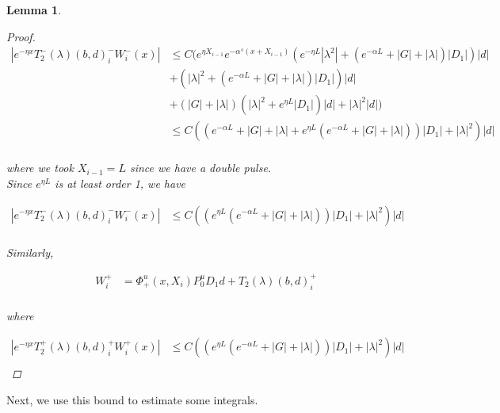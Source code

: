 \documentclass[12pt]{article}
\newtheorem{lemma}{Lemma}
\begin{document}
\begin{lemma}
\begin{proof}
\begin{align*}
| e^{-\eta x} T_2^-(\lambda)(b,d)_i^- W_i^-(x) | &\leq C ( e^{\eta X_{i-1}} e^{-\alpha^s(x + X_{i-1})} \left( e^{-\eta L}|\lambda^2| + (e^{-\alpha L} + |G| + |\lambda|)|D_1| \right)|d| \\
&+ (|\lambda|^2 + (e^{-\alpha L} + |G| + |\lambda|)|D_1| )|d| \\
&+ \left(|G| +|\lambda|\right)\left( |\lambda|^2 + e^{\eta L}|D_1|\right)|d| + |\lambda|^2 |d| )\\
&\leq C\left( \left( e^{-\alpha L} + |G| + |\lambda| + e^{\eta L}(e^{-\alpha L} + |G| + |\lambda|) \right)|D_1| + |\lambda|^2 \right) |d| \\
\end{align*}

where we took $X_{i-1} = L$ since we have a double pulse.\\

Since $e^{\eta L}$ is at least order 1, we have

\begin{align*}
| e^{-\eta x} T_2^-(\lambda)(b,d)_i^- W_i^-(x) | &\leq C\left(\left( e^{\eta L}(e^{-\alpha L} + |G| + |\lambda|) \right)|D_1| + |\lambda|^2 \right) |d| \\
\end{align*}

Similarly,

\begin{align*}
W_i^+ &= \Phi^u_+(x, X_i) P_0^u D_1 d + T_2(\lambda)(b,d)_i^+\\
\end{align*}

where 

\begin{align*}
| e^{-\eta x} T_2^+(\lambda)(b,d)_i^+ W_i^+(x) | &\leq C\left(\left( e^{\eta L}(e^{-\alpha L} + |G| + |\lambda|) \right)|D_1| + |\lambda|^2 \right) |d| \\
\end{align*}

\end{proof}
\end{lemma}

Next, we use this bound to estimate some integrals.
\end{document}
